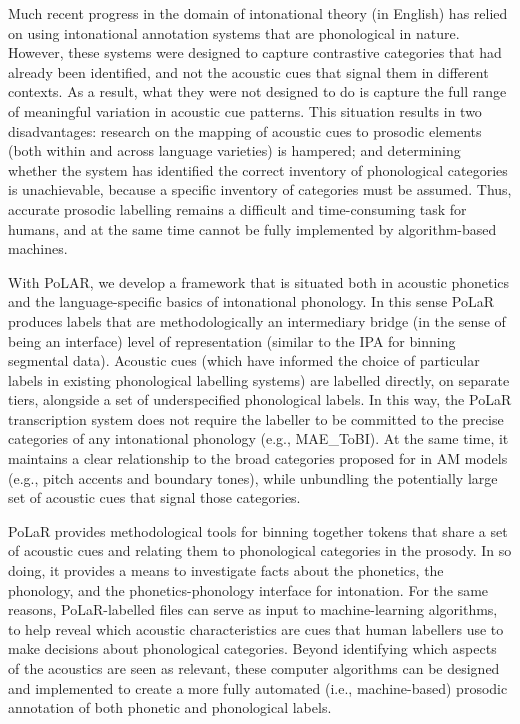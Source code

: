 \documentclass[11pt, twoside]{memoir}
\begin{document}
Much recent progress in the domain of intonational theory (in English) has relied on using intonational annotation systems that are phonological in nature.  However, these systems were designed to capture contrastive categories that had already been identified, and not the acoustic cues that signal them in different contexts.  As a result, what they were not designed to do is capture the full range of meaningful variation in acoustic cue patterns. This situation results in two disadvantages: research on the mapping of acoustic cues to prosodic elements (both within and across language varieties) is hampered; and determining whether the system has identified the correct inventory of phonological categories is unachievable, because a specific inventory of categories must be assumed. Thus, accurate prosodic labelling remains a difficult and time-consuming task for humans, and at the same time cannot be fully implemented by algorithm-based machines.

With PoLAR, we develop a framework that is situated both in acoustic phonetics and the language-specific basics of intonational phonology. In this sense PoLaR produces labels that are methodologically an intermediary bridge (in the sense of being an interface) level of representation (similar to the IPA for binning segmental data). Acoustic cues (which have informed the choice of particular labels in existing phonological labelling systems) are labelled directly, on separate tiers, alongside a set of underspecified phonological labels. In this way, the PoLaR transcription system does not require the labeller to be committed to the precise categories of any intonational phonology (e.g., MAE\_ToBI). At the same time, it maintains a clear relationship to the broad categories proposed for in AM models (e.g., pitch accents and boundary tones), while unbundling the potentially large set of acoustic cues that signal those categories.

PoLaR provides methodological tools for binning together tokens that share a set of acoustic cues and relating them to phonological categories in the prosody. In so doing, it provides a means to investigate facts about the phonetics, the phonology, and the phonetics-phonology interface for intonation. For the same reasons, PoLaR-labelled files can serve as input to machine-learning algorithms, to help reveal which acoustic characteristics are cues that human labellers use to make decisions about phonological categories. Beyond identifying which aspects of the acoustics are seen as relevant, these computer algorithms can be designed and implemented to create a more fully automated (i.e., machine-based) prosodic annotation of both phonetic and phonological labels. 
\end{document}
